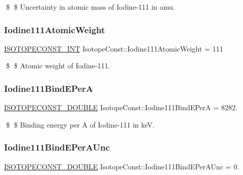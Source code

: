 \$ \$ Uncertainty in atomic mass of Iodine-\/111 in amu. \mbox{\label{group___isotope_const-_iodine-_i111_ga79565466823ae717b4989b9b8d4b1c39}} 
\subsubsection{\texorpdfstring{Iodine111\+Atomic\+Weight}{Iodine111AtomicWeight}}
{\footnotesize\ttfamily \mbox{\hyperlink{group___isotope_const-_macros_ga5f18360b3e99483a35c32d789e62621c}{I\+S\+O\+T\+O\+P\+E\+C\+O\+N\+S\+T\+\_\+\+I\+NT}} Isotope\+Const\+::\+Iodine111\+Atomic\+Weight = 111}

\$ \$ Atomic weight of Iodine-\/111. \mbox{\label{group___isotope_const-_iodine-_i111_ga1baef929d87902c616b6ba2cb0f7a67a}} 
\subsubsection{\texorpdfstring{Iodine111\+Bind\+E\+PerA}{Iodine111BindEPerA}}
{\footnotesize\ttfamily \mbox{\hyperlink{group___isotope_const-_macros_ga8f45a7272ce02c0b4c65c44636ed719a}{I\+S\+O\+T\+O\+P\+E\+C\+O\+N\+S\+T\+\_\+\+D\+O\+U\+B\+LE}} Isotope\+Const\+::\+Iodine111\+Bind\+E\+PerA = 8282.}

\$ \$ Binding energy per A of Iodine-\/111 in keV. \mbox{\label{group___isotope_const-_iodine-_i111_ga82af59e028a10427a3b34436476292d9}} 
\subsubsection{\texorpdfstring{Iodine111\+Bind\+E\+Per\+A\+Unc}{Iodine111BindEPerAUnc}}
{\footnotesize\ttfamily \mbox{\hyperlink{group___isotope_const-_macros_ga8f45a7272ce02c0b4c65c44636ed719a}{I\+S\+O\+T\+O\+P\+E\+C\+O\+N\+S\+T\+\_\+\+D\+O\+U\+B\+LE}} Isotope\+Const\+::\+Iodine111\+Bind\+E\+Per\+A\+Unc = 0.}

